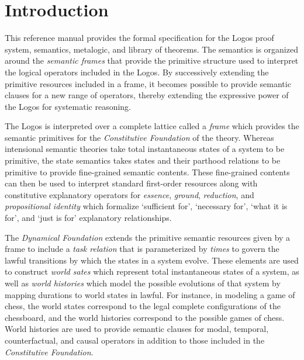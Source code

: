 \documentclass[../LogosReference.tex]{subfiles}
\begin{document}

\section{Introduction}\label{sec:introduction}

This reference manual provides the formal specification for the Logos proof system, semantics, metalogic, and library of theorems.
The semantics is organized around the \textit{semantic frames} that provide the primitive structure used to interpret the logical operators included in the Logos.
By successively extending the primitive resources included in a frame, it becomes possible to provide semantic clauses for a new range of operators, thereby extending the expressive power of the Logos for systematic reasoning.

The Logos is interpreted over a complete lattice called a \textit{frame} which provides the semantic primitives for the \textit{Constitutive Foundation} of the theory.
Whereas intensional semantic theories take total instantaneous states of a system to be primitive, the state semantics takes states and their parthood relations to be primitive to provide fine-grained semantic contents. %
These fine-grained contents can then be used to interpret standard first-order resources along with constitutive explanatory operators for \textit{essence}, \textit{ground}, \textit{reduction}, and \textit{propositional identity} which formalize `sufficient for', `necessary for', `what it is for', and `just is for' explanatory relationships.

The \textit{Dynamical Foundation} extends the primitive semantic resources given by a frame to include a \textit{task relation} that is parameterized by \textit{times} to govern the lawful transitions by which the states in a system evolve.
These elements are used to construct \textit{world sates} which represent total instantaneous states of a system, as well as \textit{world histories} which model the possible evolutions of that system by mapping durations to world states in lawful.
For instance, in modeling a game of chess, the world states correspond to the legal complete configurations of the chessboard, and the world histories correspond to the possible games of chess.
World histories are used to provide semantic clauses for modal, temporal, counterfactual, and causal operators in addition to those included in the \textit{Constitutive Foundation}.
\end{document}
